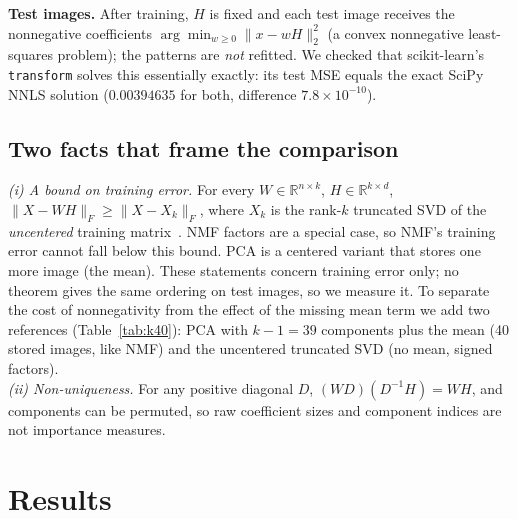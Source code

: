\documentclass[10pt]{article}
\newcommand{\RR}{\mathbb{R}}
\begin{document}
\textbf{Test images.} After training, $H$ is fixed and each test image receives the nonnegative coefficients $\arg\min_{w\ge0}\|x-wH\|_2^2$ (a convex nonnegative least-squares problem); the patterns are \emph{not} refitted. We checked that scikit-learn's \texttt{transform} solves this essentially exactly: its test MSE equals the exact SciPy NNLS solution ($0.00394635$ for both, difference $7.8\times10^{-10}$).

\subsection{Two facts that frame the comparison}
\emph{(i) A bound on training error.} For every $W\in\RR^{n\times k}$, $H\in\RR^{k\times d}$, $\|X-WH\|_F\ge\|X-X_k\|_F$, where $X_k$ is the rank-$k$ truncated SVD of the \emph{uncentered} training matrix~\cite{eckart1936}. NMF factors are a special case, so NMF's training error cannot fall below this bound. PCA is a centered variant that stores one more image (the mean). These statements concern training error only; no theorem gives the same ordering on test images, so we measure it. To separate the cost of nonnegativity from the effect of the missing mean term we add two references (Table~\ref{tab:k40}): PCA with $k-1=39$ components plus the mean (40 stored images, like NMF) and the uncentered truncated SVD (no mean, signed factors).\\
\emph{(ii) Non-uniqueness.} For any positive diagonal $D$, $(WD)(D^{-1}H)=WH$, and components can be permuted, so raw coefficient sizes and component indices are not importance measures.

\section{Results}
\end{document}
